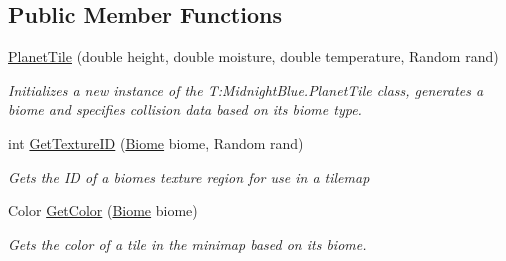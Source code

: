 \subsection*{Public Member Functions}
\begin{DoxyCompactItemize}
\item 
\hyperlink{class_midnight_blue_1_1_planet_tile_aa8fd125394504682bd0c2f2d9d28622b}{Planet\+Tile} (double height, double moisture, double temperature, Random rand)
\begin{DoxyCompactList}\small\item\em Initializes a new instance of the T\+:\+Midnight\+Blue.\+Planet\+Tile class, generates a biome and specifies collision data based on its biome type. \end{DoxyCompactList}\item 
int \hyperlink{class_midnight_blue_1_1_planet_tile_a0ba5d9886790e8f8d9e54e1873d5565b}{Get\+Texture\+ID} (\hyperlink{namespace_midnight_blue_a8a6ba5637b64c3eb991f00d48decf381}{Biome} biome, Random rand)
\begin{DoxyCompactList}\small\item\em Gets the ID of a biomes texture region for use in a tilemap \end{DoxyCompactList}\item 
Color \hyperlink{class_midnight_blue_1_1_planet_tile_a0efc70f73aaf5a252cfe6b96deb9aa22}{Get\+Color} (\hyperlink{namespace_midnight_blue_a8a6ba5637b64c3eb991f00d48decf381}{Biome} biome)
\begin{DoxyCompactList}\small\item\em Gets the color of a tile in the minimap based on its biome. \end{DoxyCompactList}\end{DoxyCompactItemize}
